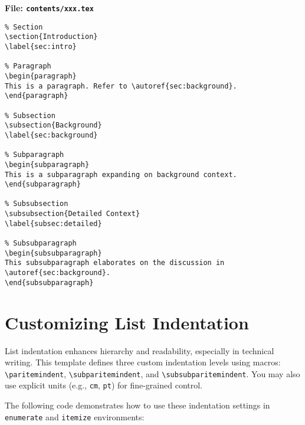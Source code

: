 \noindent\textbf{File: \texttt{contents/xxx.tex}}\vspace{-1em}
\begin{verbatim}
% Section
\section{Introduction}
\label{sec:intro}

% Paragraph
\begin{paragraph}
This is a paragraph. Refer to \autoref{sec:background}.
\end{paragraph}

% Subsection
\subsection{Background}
\label{sec:background}

% Subparagraph
\begin{subparagraph}
This is a subparagraph expanding on background context.
\end{subparagraph}

% Subsubsection
\subsubsection{Detailed Context}
\label{subsec:detailed}

% Subsubparagraph
\begin{subsubparagraph}
This subsubparagraph elaborates on the discussion in \autoref{sec:background}.
\end{subsubparagraph}
\end{verbatim}

\section{Customizing List Indentation}
\label{ch3:indentation}

\begin{paragraph}
List indentation enhances hierarchy and readability, especially in technical writing. This template defines three custom indentation levels using macros: \verb|\paritemindent|, \verb|\subparitemindent|, and \verb|\subsubparitemindent|. You may also use explicit units (e.g., \texttt{cm}, \texttt{pt}) for fine-grained control.
\end{paragraph}

\begin{subparagraph}
The following code demonstrates how to use these indentation settings in \texttt{enumerate} and \texttt{itemize} environments:
\end{subparagraph}

